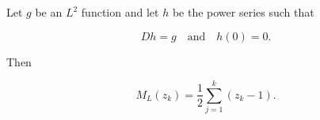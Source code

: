 Let $g$ be an $L^2$ function and let $h$ be the power series such that

$$Dh = g \quad \text{and} \quad h(0) = 0.$$

Then

$$M_L(z_k) = \frac{1}{2} \sum_{j=1}^{k} (z_k - 1).$$
